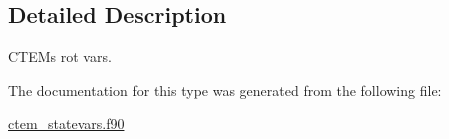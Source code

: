 \subsection{Detailed Description}
C\+T\+E\+M\textquotesingle{}s \textquotesingle{}rot\textquotesingle{} vars. 

The documentation for this type was generated from the following file\+:\begin{DoxyCompactItemize}
\item 
\hyperlink{ctem__statevars_8f90}{ctem\+\_\+statevars.\+f90}\end{DoxyCompactItemize}

